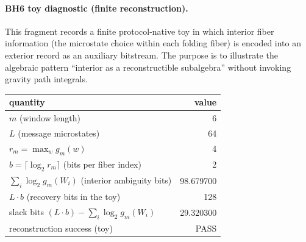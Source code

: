 \paragraph{BH6 toy diagnostic (finite reconstruction).} \AuditTag This fragment records a finite protocol-native toy in which interior fiber information (the microstate choice within each folding fiber) is encoded into an exterior record as an auxiliary bitstream. The purpose is to illustrate the algebraic pattern ``interior as a reconstructible subalgebra'' without invoking gravity path integrals.
\begin{center}
\scriptsize
\setlength{\tabcolsep}{6pt}
\renewcommand{\arraystretch}{1.15}
\begin{tabular}{l r}
\toprule
quantity & value \\
\midrule
$m$ (window length) & 6 \\
$L$ (message microstates) & 64 \\
$r_m=\max_w g_m(w)$ & 4 \\
$b=\lceil\log_2 r_m\rceil$ (bits per fiber index) & 2 \\
$\sum_i \log_2 g_m(W_i)$ (interior ambiguity bits) & 98.679700 \\
$L\cdot b$ (recovery bits in the toy) & 128 \\
slack bits $(L\cdot b)-\sum_i\log_2 g_m(W_i)$ & 29.320300 \\
reconstruction success (toy) & PASS \\
\bottomrule
\end{tabular}
\end{center}